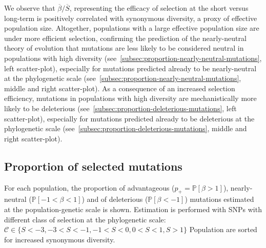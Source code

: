 \documentclass{article}
\newcommand{\proba}{\mathbb{P}}
\newcommand{\Sphy}{S}
\newcommand{\Sphyclass}{\mathcal{C}}
\newcommand{\SphyMean}{\overline{\Sphy}}
\newcommand{\divStrongDel}{\Sphy < -3}
\newcommand{\divDel}{-3 < \Sphy < -1}
\newcommand{\divWeakDel}{-1 < \Sphy < 0}
\newcommand{\divWeakAdv}{0 < \Sphy < 1}
\newcommand{\divAdv}{ \Sphy > 1}
\newcommand{\Spop}{\beta}
\newcommand{\SpopMean}{\overline{\Spop}}
\newcommand{\polyDel}{\Spop < -1}
\newcommand{\polyNeutral}{-1 < \Spop < 1}
\newcommand{\polyAdv}{ \Spop > 1}
\newcommand{\PpolyDel}{\proba \left[ \polyDel \right]}
\newcommand{\PpolyNeutral}{\proba \left[ \polyNeutral \right]}
\newcommand{\PpolyAdv}{\proba \left[ \polyAdv \right]}
\begin{document}
    We observe that $\SpopMean/\SphyMean$, representing the efficacy of selection at the short versus long-term is positively correlated with synonymous diversity, a proxy of effective population size.
    Altogether, populations with a large effective population size are under more efficient selection, confirming the prediction of the nearly-neutral theory of evolution that mutations are less likely to be considered neutral in populations with high diversity (see~\ref{subsec:proportion-nearly-neutral-mutations}, left scatter-plot), especially for mutations predicted already to be nearly-neutral at the phylogenetic scale (see~\ref{subsec:proportion-nearly-neutral-mutations}, middle and right scatter-plot).
    As a consequence of an increased selection efficiency, mutations in populations with high diversity are mechanistically more likely to be deleterious (see~\ref{subsec:proportion-deleterious-mutations}, left scatter-plot), especially for mutations predicted already to be deleterious at the phylogenetic scale (see~\ref{subsec:proportion-deleterious-mutations}, middle and right scatter-plot).

    \newpage

    \subsection{Proportion of selected mutations}

    For each population, the proportion of advantageous ($p_+=\PpolyAdv$), nearly-neutral ($\PpolyNeutral$) and of deleterious ($\PpolyDel$) mutations estimated at the population-genetic scale is shown.
    Estimation is performed with SNPs with different class of selection at the phylogenetic scale: $\Sphyclass \in \{ \divStrongDel, \divDel,  \divWeakDel,  \divWeakAdv, \divAdv \}$
    Population are sorted for increased synonymous diversity.
\end{document}
